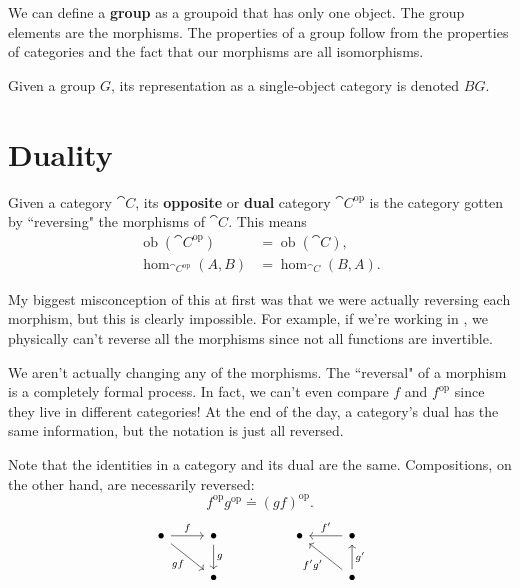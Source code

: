 \documentclass[twoside,10pt]{report}
\DeclareMathOperator{\op}{op}
\DeclareMathOperator{\ob}{ob}
\begin{document}
\begin{ex}[]
	We can define a \textbf{group} as a groupoid that has only one object. The group elements are the morphisms. The properties of a group follow from the properties of categories and the fact that our morphisms are all isomorphisms.

	Given a group $G$, its representation as a single-object category is denoted $BG$.
\end{ex}




\section{Duality}


\begin{defn}
	Given a category $\cat{C}$, its \textbf{opposite} or \textbf{dual} category $\cat{C}^{\text{op}}$ is the category gotten by ``reversing" the morphisms of $\cat{C}$. This means
	\begin{align*}
		\ob(\cat{C}^{\op}) &= \ob(\cat{C}),\\
		\hom_{\cat{C}^{\text{op}}}(A,B) &= \hom_{\cat{C}}(B,A).
	\end{align*}
\end{defn}
My biggest misconception of this at first was that we were actually reversing each morphism, but this is clearly impossible. For example, if we're working in , we physically can't reverse all the morphisms since not all functions are invertible.

\begin{note}[]
	We aren't actually changing any of the morphisms. The ``reversal" of a morphism is a completely formal process. In fact, we can't even compare $f$ and $f^{\op}$ since they live in different categories! At the end of the day, a category's dual has the same information, but the notation is just all reversed.
\end{note}

Note that the identities in a category and its dual are the same. Compositions, on the other hand, are necessarily reversed:
\[
	f^{\op} g^{\op} \doteq (gf)^{\op}.
\] 
\[
\begin{tikzcd}
	\bullet \arrow[r, "f"] \arrow[rd, "gf"'] & \bullet \arrow[d, "g"] &  & \bullet & \bullet \arrow[l, "f'"']                    \\
                                         & \bullet                &  &         & \bullet \arrow[lu, "f'g'"] \arrow[u, "g'"']
\end{tikzcd}
\] 
\end{document}

